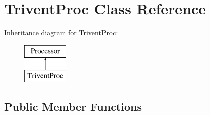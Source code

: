 \section{Trivent\-Proc Class Reference}
\label{classTriventProc}
Inheritance diagram for Trivent\-Proc\-:\begin{figure}[H]
\begin{center}
\leavevmode
\includegraphics[height=2.000000cm]{classTriventProc}
\end{center}
\end{figure}
\subsection*{Public Member Functions}
